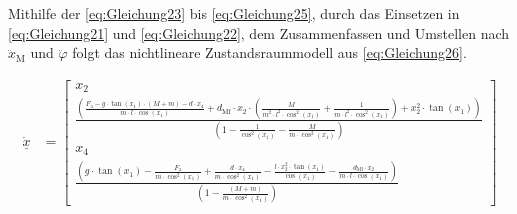 Mithilfe der \autoref{eq:Gleichung23} bis \autoref{eq:Gleichung25}, durch das Einsetzen in \autoref{eq:Gleichung21} und \autoref{eq:Gleichung22}, dem Zusammenfassen und Umstellen nach $\ddot x_{\mathrm{M}}$ und $\ddot \varphi$ folgt das nichtlineare Zustandsraummodell aus \autoref{eq:Gleichung26}.

\begin{align}\label{eq:Gleichung26}
    \dot{\underline{x}} &=
    \begin{bmatrix}
        x_2 \\
        \frac{\left(\frac{F_{\mathrm{a}} - g \cdot \tan(x_{\mathrm{1}}) \cdot (M + m) - d \cdot x_{\mathrm{4}}}{m \cdot l \cdot \cos(x_{\mathrm{1}})} + d_{\mathrm{Mf}} \cdot x_{\mathrm{2}} \cdot \left(\frac{M}{m^2 \cdot l^2 \cdot \cos^2(x_{\mathrm{1}})} + \frac{1}{m \cdot l^2 \cdot \cos^2(x_{\mathrm{1}})}\right) + x_{\mathrm{2}}^2 \cdot \tan(x_{\mathrm{1}})\right)}{\left(1 - \frac{1}{\cos^2(x_{\mathrm{1}})} - \frac{M}{m \cdot \cos^2(x_{\mathrm{1}})}\right)} \\
        x_{\mathrm{4}} \\
        \frac{\left(g \cdot \tan(x_{\mathrm{1}}) - \frac{F_{\mathrm{a}}}{m \cdot \cos^2(x_{\mathrm{1}})} + \frac{d \cdot x_{\mathrm{4}}}{m \cdot \cos^2(x_{\mathrm{1}})} - \frac{l \cdot x_{\mathrm{2}}^2 \cdot \tan(x_{\mathrm{1}})}{\cos(x_{\mathrm{1}})} - \frac{d_{\mathrm{Mf}} \cdot x_{\mathrm{2}}}{m \cdot l \cdot \cos(x_{\mathrm{1}})}\right)}{\left(1 - \frac{(M + m)}{m \cdot \cos^2(x_{\mathrm{1}})}\right)}
    \end{bmatrix}
\end{align}